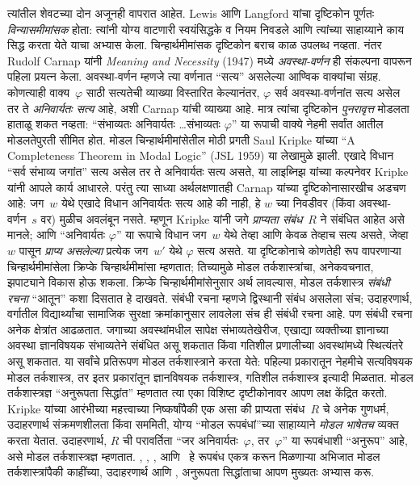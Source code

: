 त्यांतील शेवटच्या दोन अजूनही वापरात आहेत.
Lewis आणि Langford यांचा दृष्टिकोन पूर्णतः \emph{विन्यासमीमांसक}
होता: त्यांनी योग्य वाटणारी स्वयंसिद्धके व नियम निवडले आणि
त्यांच्या साहाय्याने काय सिद्ध करता येते याचा अभ्यास केला.
चिन्हार्थमीमांसक दृष्टिकोन बराच काळ उपलब्ध नव्हता.
नंतर Rudolf Carnap यांनी \emph{Meaning and Necessity} (1947)
मध्ये \emph{अवस्था-वर्णन} ही संकल्पना वापरून पहिला प्रयत्न केला.
अवस्था-वर्णन म्हणजे त्या वर्णनात ``सत्य'' असलेल्या आण्विक
वाक्यांचा संग्रह. कोणत्याही वाक्य~$\varphi$ साठी सत्यतेची व्याख्या
विस्तारित केल्यानंतर, $\varphi$ सर्व अवस्था-वर्णनांत सत्य असेल
तर ते \emph{अनिवार्यतः सत्य} आहे, अशी Carnap यांची व्याख्या आहे.
मात्र त्यांचा दृष्टिकोन \emph{पुनरावृत्त} मोडलता हाताळू शकत
नव्हता: ``संभाव्यतः अनिवार्यतः \ldots संभाव्यतः $\varphi$''
या रूपाची वाक्ये नेहमी सर्वांत आतील मोडलतेपुरती सीमित होत.
मोडल चिन्हार्थमीमांसेतील मोठी प्रगती Saul Kripke यांच्या
``A Completeness Theorem in Modal Logic'' (JSL 1959) या
लेखामुळे झाली. एखादे विधान ``सर्व संभाव्य जगांत'' सत्य
असेल तर ते अनिवार्यतः सत्य असते, या लाइब्निझ यांच्या कल्पनेवर
Kripke यांनी आपले कार्य आधारले. परंतु त्या साध्या अर्थलक्षणातही
Carnap यांच्या दृष्टिकोनासारखीच अडचण आहे: जग~$w$ येथे एखादे
विधान अनिवार्यतः सत्य आहे की नाही, हे $w$ च्या निवडीवर
(किंवा अवस्था-वर्णन~$s$ वर) मुळीच अवलंबून नसते.
म्हणून Kripke यांनी जगे \emph{प्राप्यता संबंध}~$R$ ने
संबंधित आहेत असे मानले; आणि ``अनिवार्यतः $\varphi$'' या रूपाचे
विधान जग~$w$ येथे तेव्हा आणि केवळ तेव्हाच सत्य असते,
जेव्हा $w$ पासून \emph{प्राप्य असलेल्या} प्रत्येक जग~$w'$
येथे $\varphi$ सत्य असते. या दृष्टिकोनाचे कोणतेही रूप वापरणाऱ्या
चिन्हार्थमीमांसेला क्रिप्के चिन्हार्थमीमांसा म्हणतात;
तिच्यामुळे मोडल तर्कशास्त्रांचा, अनेकवचनात, झपाट्याने विकास
होऊ शकला.
क्रिप्के चिन्हार्थमीमांसेनुसार अर्थ लावल्यास, मोडल तर्कशास्त्र
\emph{संबंधी रचना} ``आतून'' कशा दिसतात हे दाखवते. संबंधी
रचना म्हणजे द्विस्थानी संबंध असलेला संच; उदाहरणार्थ,
वर्गातील विद्यार्थ्यांचा सामाजिक सुरक्षा क्रमांकानुसार
लावलेला संच ही संबंधी रचना आहे. पण संबंधी रचना अनेक
क्षेत्रांत आढळतात. जगाच्या अवस्थांमधील सापेक्ष संभाव्यतेखेरीज,
एखाद्या व्यक्तीच्या ज्ञानाच्या अवस्था ज्ञानविषयक संभाव्यतेने
संबंधित असू शकतात किंवा गतिशील प्रणालीच्या अवस्थांमध्ये
स्थित्यंतरे असू शकतात. या सर्वांचे प्रतिरूपण मोडल तर्कशास्त्राने
करता येते: पहिल्या प्रकारातून नेहमीचे सत्यविषयक मोडल तर्कशास्त्र,
तर इतर प्रकारांतून ज्ञानविषयक तर्कशास्त्र, गतिशील तर्कशास्त्र
इत्यादी मिळतात.
मोडल तर्कशास्त्रज्ञ ``अनुरूपता सिद्धांत'' म्हणतात त्या एका
विशिष्ट दृष्टीकोनावर आपण लक्ष केंद्रित करतो. Kripke यांच्या
आरंभीच्या महत्त्वाच्या निष्कर्षांपैकी एक असा की प्राप्यता
संबंध~$R$ चे अनेक गुणधर्म, उदाहरणार्थ संक्रमणशीलता किंवा
सममिती, योग्य ``मोडल रूपबंधां''च्या साहाय्याने
\emph{मोडल भाषेतच} व्यक्त करता येतात. उदाहरणार्थ,
$R$ ची परावर्तिता ``जर अनिवार्यतः~$\varphi$, तर~$\varphi$'' या
रूपबंधाशी ``अनुरूप'' आहे, असे मोडल तर्कशास्त्रज्ञ म्हणतात.
, , ,  आणि~ हे रूपबंध
एकत्र करून मिळणाऱ्या अभिजात मोडल तर्कशास्त्रांपैकी
काहींच्या, उदाहरणार्थ  आणि , अनुरूपता
सिद्धांताचा आपण मुख्यतः अभ्यास करू.
